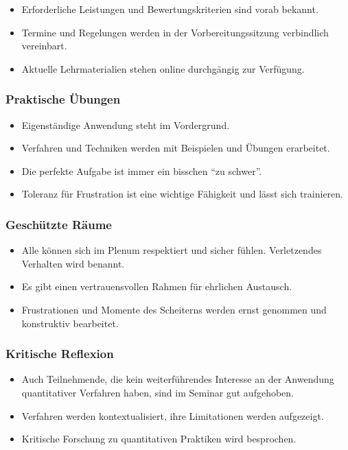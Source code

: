 \documentclass[11pt,german,a4paper]{article}
\providecommand{\tightlist}{%
  \setlength{\itemsep}{0pt}\setlength{\parskip}{0pt}}
\begin{document}
\begin{itemize}
\tightlist
\item
  Erforderliche Leistungen und Bewertungskriterien sind vorab bekannt.
\item
  Termine und Regelungen werden in der Vorbereitungssitzung verbindlich vereinbart.
\item
  Aktuelle Lehrmaterialien stehen online durchgängig zur Verfügung.
\end{itemize}

\hypertarget{praktische-uxfcbungen}{%
\subsubsection{Praktische Übungen}\label{praktische-uxfcbungen}}

\begin{itemize}
\tightlist
\item
  Eigenständige Anwendung steht im Vordergrund.
\item
  Verfahren und Techniken werden mit Beispielen und Übungen erarbeitet.
\item
  Die perfekte Aufgabe ist immer ein bisschen ``zu schwer''.
\item
  Toleranz für Frustration ist eine wichtige Fähigkeit und lässt sich trainieren.
\end{itemize}

\hypertarget{geschuxfctzte-ruxe4ume}{%
\subsubsection{Geschützte Räume}\label{geschuxfctzte-ruxe4ume}}

\begin{itemize}
\tightlist
\item
  Alle können sich im Plenum respektiert und sicher fühlen. Verletzendes Verhalten wird benannt.
\item
  Es gibt einen vertrauensvollen Rahmen für ehrlichen Austausch.
\item
  Frustrationen und Momente des Scheiterns werden ernst genommen und konstruktiv bearbeitet.
\end{itemize}

\hypertarget{kritische-reflexion}{%
\subsubsection{Kritische Reflexion}\label{kritische-reflexion}}

\begin{itemize}
\tightlist
\item
  Auch Teilnehmende, die kein weiterführendes Interesse an der Anwendung quantitativer Verfahren haben, sind im Seminar gut aufgehoben.
\item
  Verfahren werden kontextualisiert, ihre Limitationen werden aufgezeigt.
\item
  Kritische Forschung zu quantitativen Praktiken wird besprochen.
\end{itemize}
\end{document}

